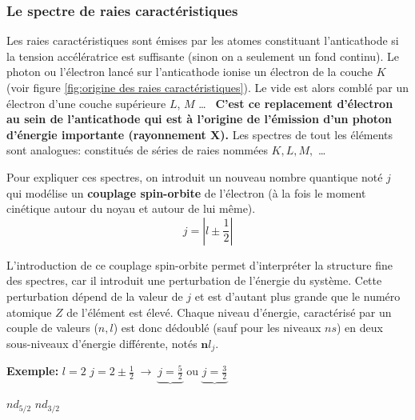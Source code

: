 \documentclass{article}
\begin{document}
\newpage

\subsubsection{Le spectre de raies caractéristiques}
Les raies caractéristiques sont émises par les atomes constituant l'anticathode si la tension 
accélératrice est suffisante (sinon on a seulement un fond continu).
Le photon ou l'électron lancé sur l'anticathode ionise un électron de la couche $K$ (voir figure \ref{fig:origine des raies caractéristiques}). Le vide est alors comblé par un électron d'une couche supérieure $L$, $M$ \dots 
\, \textbf{C'est ce replacement d'électron au sein de l'anticathode qui est à l'origine de l'émission d'un photon d'énergie importante (rayonnement X).}
Les spectres de tout les éléments sont analogues: constitués de séries de raies 
nommées $K, L, M, $ \dots

Pour expliquer ces spectres, on introduit un nouveau nombre quantique noté $j$ qui modélise un \textbf{couplage spin-orbite} de l'électron (à la fois le moment cinétique autour du noyau et autour de lui même).
$$j=\left|l\pm \frac{1}{2}\right|$$

L'introduction de ce couplage spin-orbite permet d'interpréter la structure fine des 
spectres, car il introduit une perturbation de l'énergie du système. Cette perturbation dépend de 
la valeur de $j$ et est d'autant plus grande que le numéro atomique $Z$ de l'élément est élevé. 
Chaque niveau d'énergie, caractérisé par un couple de valeurs ($n, l$) est donc dédoublé 
(sauf pour les niveaux $ns$) en deux sous-niveaux d'énergie différente, notés $\bm{n}l_j$.

\textbf{Exemple:} \quad $l=2$ \quad $j=2\pm \frac{1}{2} \; \rightarrow \; \underbrace{j=\frac{5}{2}}$ ou $\underbrace{j=\frac{3}{2}}$

\hspace{5.8cm} $nd_{5/2}$ \hspace{0.7cm} $nd_{3/2}$
\end{document}
